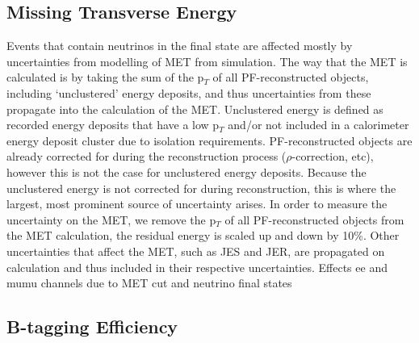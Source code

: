 
\subsection{Missing Transverse Energy} \label{subsec-METUncertainty}

Events that contain neutrinos in the final state are affected mostly by uncertainties from modelling of MET from simulation. The way that the MET is calculated is by taking the sum of the p$_T$ of all PF-reconstructed objects, including `unclustered' energy deposits, and thus uncertainties from these propagate into the calculation of the MET. Unclustered energy is defined as recorded energy deposits that have a low p$_T$ and/or not included in a calorimeter energy deposit cluster due to isolation requirements. PF-reconstructed objects are already corrected for during the reconstruction process ($\rho$-correction, etc), however this is not the case for unclustered energy deposits. Because the unclustered energy is not corrected for during reconstruction, this is where the largest, most prominent source of uncertainty arises. In order to measure the uncertainty on the MET, we remove the p$_T$ of all PF-reconstructed objects from the MET calculation, the residual energy is scaled up and down by 10\%. Other uncertainties that affect the MET, such as JES and JER, are propagated on calculation and thus included in their respective uncertainties. Effects ee and mumu channels due to MET cut and neutrino final states %




\subsection{B-tagging Efficiency} \label{subsec-BTagEfficiency}

